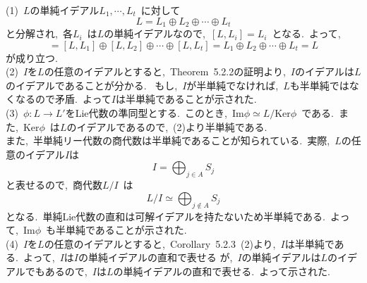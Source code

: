 \documentclass[uplatex,dvipdfmx]{jsarticle}
\begin{document}
\begin{myproof}
    (1)~$L$の単純イデアル$L_1,\cdots,L_t$~に対して
    \begin{equation*}
        L=L_1\oplus L_2 \oplus \cdots \oplus L_t
    \end{equation*}
    と分解され,~各$L_i$~は$L$の単純イデアルなので,~$[L,L_i]=L_i$~となる.~よって,
    \begin{equation*}
        [L,L]=[L,L_1]\oplus [L,L_2]\oplus \cdots \oplus [L,L_t]=L_1\oplus L_2 \oplus \cdots \oplus L_t=L
    \end{equation*}
    が成り立つ.\\
    (2)~$I$を$L$の任意のイデアルとすると,~Theorem~5.2.2の証明より,~$I$のイデアルは$L$のイデアルであることが分かる.
    ~もし,~$I$が半単純でなければ,~$L$も半単純ではなくなるので矛盾.~よって$I$は半単純であることが示された.\\
    (3)~$\phi :L\to L'$をLie代数の準同型とする.~このとき,~$\text{Im} \phi \simeq L/\text{Ker} \phi$~である.~また,~$\text{Ker} \phi$~は$L$のイデアルであるので,~(2)より半単純である.\\
    また,~半単純リー代数の商代数は半単純であることが知られている.~実際,~$L$の任意のイデアル$I$は
    \begin{equation*}
        I = \bigoplus_{j \in A} S_j
    \end{equation*}
    と表せるので,~商代数$L/I$~は
    \begin{equation*}
        L/I \simeq \bigoplus_{j \notin A} S_j
    \end{equation*}
    となる.~単純Lie代数の直和は可解イデアルを持たないため半単純である.~よって,~$\text{Im} \phi$~も半単純であることが示された.\\
    (4)~$I$を$L$の任意のイデアルとすると,~Corollary~5.2.3~(2)より,~$I$は半単純である.~よって,~$I$は$I$の単純イデアルの直和で表せる
    が,~$I$の単純イデアルは$L$のイデアルでもあるので,~$I$は$L$の単純イデアルの直和で表せる.~よって示された.
\end{myproof}
\newpage
\end{document}
